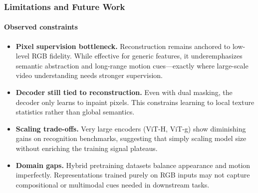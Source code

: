 \begin{enrichment}
\begin{enrichment}
            \endgroup
            
            \subsubsection{Limitations and Future Work}
            \label{subsubsec_chapter24_videomaev2_limits}
            
            \paragraph{Observed constraints}
            \begin{itemize}
                \item \textbf{Pixel supervision bottleneck.} Reconstruction remains anchored to low-level RGB fidelity. While effective for generic features, it underemphasizes semantic abstraction and long-range motion cues—exactly where large-scale video understanding needs stronger supervision.
                \item \textbf{Decoder still tied to reconstruction.} Even with dual masking, the decoder only learns to inpaint pixels. This constrains learning to local texture statistics rather than global semantics.
                \item \textbf{Scaling trade-offs.} Very large encoders (ViT-H, ViT-g) show diminishing gains on recognition benchmarks, suggesting that simply scaling model size without enriching the training signal plateaus.
                \item \textbf{Domain gaps.} Hybrid pretraining datasets balance appearance and motion imperfectly. Representations trained purely on RGB inputs may not capture compositional or multimodal cues needed in downstream tasks.
            \end{itemize}
            

\end{enrichment}
\end{enrichment}
